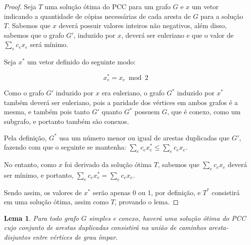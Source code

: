 \documentclass[12pt, a4paper]{article}
\newtheorem{lemma}{Lema}
\begin{document}
\begin{proof}
    Seja $T$ uma solução ótima do PCC para um grafo $G$ e $x$ um vetor indicando a quantidade de cópias necessárias de cada aresta de $G$ para a solução $T$. 
    Sabemos que $x$ deverá possuir valores inteiros não negativos, além disso, sabemos que o grafo $G'$, induzido por $x$, deverá ser euleriano e que o valor de $\sum_e c_ex_e$ será mínimo.

    Seja $x^*$ um vetor definido do seguinte modo:

    \[  x^*_e = x_e \bmod 2    \]

    Como o grafo $G'$ induzido por $x$ era euleriano, o grafo $G^*$ induzido por $x^*$ também deverá ser euleriano, pois a paridade dos vértices em ambos grafos é a mesma, e também pois tanto $G'$ quanto $G^*$ possuem $G$, que é conexo, como um subgrafo, e portanto também são conexos.
    
    Pela definição, $G^*$ usa um número menor ou igual de arestas duplicadas que $G'$, fazendo com que o seguinte se mantenha: $\sum_e c_ex^*_e \leq \sum_e c_ex_e$.

    No entanto, como $x$ foi derivado da solução ótima $T$, sabemos que $\sum_e c_ex_e$ deverá ser mínimo, e portanto, $\sum_e c_ex^*_e = \sum_e c_ex_e$. 

    Sendo assim, os valores de $x^*$ serão apenas 0 ou 1, por definição, e $T^*$ consistirá em uma solução ótima, assim como $T$, provando o lema.

\end{proof}

\begin{lemma}
    Para todo grafo $G$ simples e conexo, haverá uma solução ótima do PCC cujo conjunto de arestas duplicadas consistirá na união de caminhos aresta-disjuntos entre vértices de grau ímpar.
\end{lemma}
\end{document}
